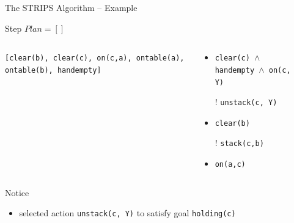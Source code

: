 \documentclass[presentation]{beamer}\mode<presentation>{\usetheme{AMSBolognaFC}}
\begin{document}
\begin{frame}[c]{The STRIPS Algorithm -- Example}
\small

    \begin{exampleblock}{Step \nextStripsExampleStep{} \hfill $Plan = []$}
        \begin{columns}[t]
            \begin{column}{.30\linewidth}\centering
                \texttt{[clear(b), clear(c), on(c,a), ontable(a), ontable(b), handempty]}
            \end{column}
            \begin{column}{.50\linewidth}\centering
                \begin{itemize}
                    \item \texttt{clear(c) $\wedge$ handempty $\wedge$ on(c, Y)}
                    \item[!] \texttt{unstack(c, Y)}
                    \item \texttt{clear(b)}
                    \item[!] \texttt{stack(c,b)}
                    \item \texttt{on(a,c)}
                \end{itemize}
            \end{column}
            \begin{column}{.10\linewidth}\centering
                
            \end{column}
        \end{columns}
    \end{exampleblock}

    \vfill

    \footnotesize
    Notice
    \begin{itemize}\tiny
        \item selected action \texttt{unstack(c, Y)} to satisfy goal \texttt{holding(c)}
    \end{itemize}

\end{frame}
\end{document}
